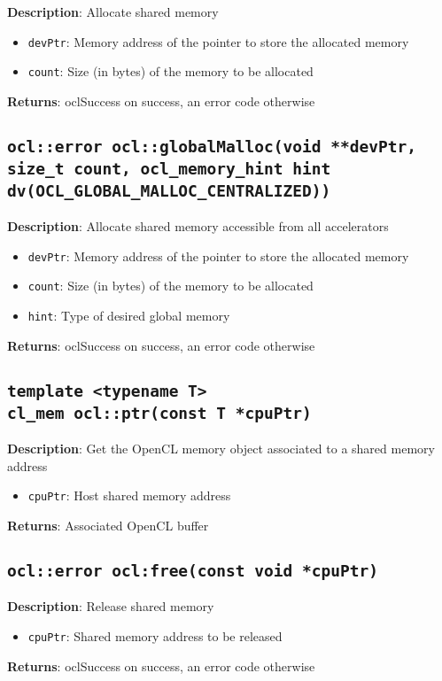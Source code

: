 \textbf{Description}: Allocate shared memory
\begin{itemize}
  \item \texttt{devPtr}: Memory address of the pointer to store the allocated memory
  \item \texttt{count}: Size (in bytes) of the memory to be allocated
\end{itemize}
\textbf{Returns}: oclSuccess on success, an error code otherwise

\subsection{\texttt{ocl::error ocl::globalMalloc(void **devPtr, size\_t count, ocl\_memory\_hint 
hint dv(OCL\_GLOBAL\_MALLOC\_CENTRALIZED))}}

\textbf{Description}: Allocate shared memory accessible from all accelerators
\begin{itemize}
  \item \texttt{devPtr}: Memory address of the pointer to store the allocated memory
  \item \texttt{count}: Size (in bytes) of the memory to be allocated
  \item \texttt{hint}: Type of desired global memory
\end{itemize}
\textbf{Returns}: oclSuccess on success, an error code otherwise

\subsection{\texttt{template <typename T>\\cl\_mem ocl::ptr(const T *cpuPtr)}}

\textbf{Description}: Get the OpenCL memory object associated to a shared memory address
\begin{itemize}
  \item \texttt{cpuPtr}: Host shared memory address
\end{itemize}
\textbf{Returns}: Associated OpenCL buffer

\subsection{\texttt{ocl::error ocl:free(const void *cpuPtr)}}

\textbf{Description}: Release shared memory
\begin{itemize}
  \item \texttt{cpuPtr}: Shared memory address to be released
\end{itemize}
\textbf{Returns}: oclSuccess on success, an error code otherwise

